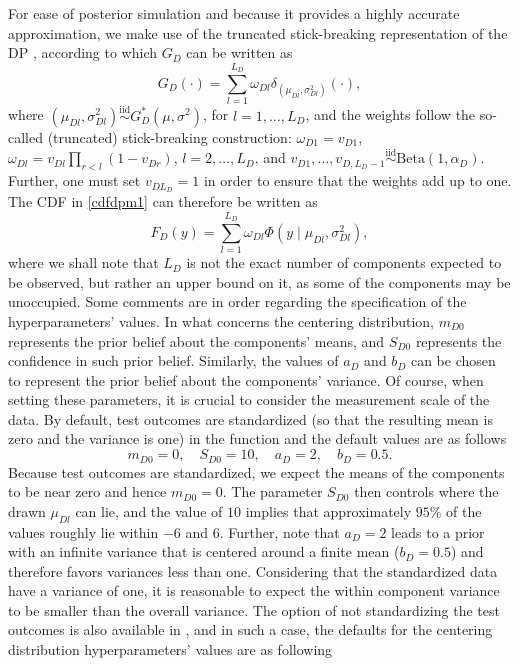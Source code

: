 For ease of posterior simulation and because it provides a highly accurate approximation, we make use of the truncated stick-breaking representation of the DP \citep{Ishwaran2001}, according to which $G_D$ can be written as
\begin{equation*}
G_{D}(\cdot)=\sum_{l=1}^{L_D}\omega_{Dl}\delta_{(\mu_{Dl},\sigma^2_{Dl})}(\cdot),
\end{equation*}
where $(\mu_{Dl},\sigma^2_{Dl})\overset{\text{iid}}\sim G_D^{*}(\mu,\sigma^2)$, for $l=1,\ldots,L_D$, and the weights follow the so-called (truncated) stick-breaking construction: $\omega_{D1}=v_{D1}$, $\omega_{Dl}=v_{Dl}\prod_{r<l}(1-v_{Dr})$, $l=2,\ldots,L_D$, and $v_{D1},\ldots,v_{D,L_{D}-1}\overset{\text{iid}}\sim\text{Beta}(1,\alpha_D)$. Further, one must set $v_{DL_{D}}=1$ in order to ensure that the weights add up to one. The CDF in \eqref{cdfdpm1} can therefore be written as
\begin{equation*}
F_{D}(y)=\sum_{l=1}^{L_D}\omega_{Dl}\Phi(y\mid\mu_{Dl},\sigma_{Dl}^{2}),
\end{equation*}
where we shall note that $L_D$ is not the exact number of components expected to be observed, but rather an upper bound on it, as some of the components may be unoccupied. Some comments are in order regarding the specification of the hyperparameters' values. In what concerns the centering distribution, $m_{D0}$ represents the prior belief about the components' means, and $S_{D0}$ represents the confidence in such prior belief. Similarly, the values of $a_D$ and $b_D$ can be chosen to represent the prior belief about the components' variance. Of course, when setting these parameters, it is crucial to consider the measurement scale of the data. By default, test outcomes are standardized (so that the resulting mean is zero and the variance is one) in the  function and the default values are as follows
\begin{equation*}
m_{D0} = 0,\quad S_{D0} = 10, \quad a_D = 2, \quad b_D = 0.5.
\end{equation*}
Because test outcomes are standardized, we expect the means of the components to be near zero and hence $m_{D0}=0$. The parameter $S_{D0}$ then controls where the drawn $\mu_{Dl}$ can lie, and the value of $10$ implies that approximately $95\%$ of the values roughly lie within $-6$ and $6$. Further, note that $a_D = 2$ leads to a prior with an infinite variance that is centered around a finite mean ($b_D = 0.5$) and therefore favors variances less than one. Considering that the standardized data have a variance of one, it is reasonable to expect the within component variance to be smaller than the overall variance. The option of not standardizing the test outcomes is also available in , and in such a case, the  defaults for the centering distribution hyperparameters' values are as following

